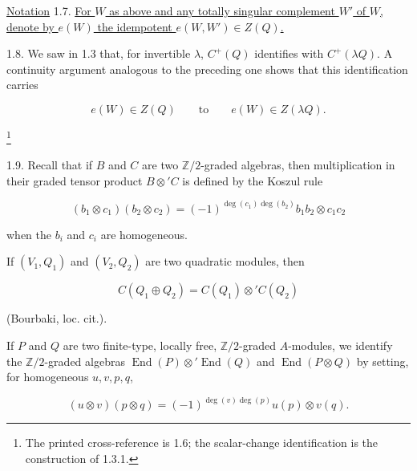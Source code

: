 \underline{Notation} 1.7. \underline{For $W$ as above and any totally
singular complement $W'$ of $W$, denote by $e(W)$ the idempotent
$e(W,W')\in Z(Q)$.}

1.8. We saw in 1.3 that, for invertible $\lambda$, $C^+(Q)$ identifies
with $C^+(\lambda Q)$.  A continuity argument analogous to the preceding
one shows that this identification carries

\begin{equation*}
e(W)\in Z(Q)\qquad\text{to}\qquad e(W)\in Z(\lambda Q).
\end{equation*}

\footnote{The printed cross-reference is 1.6; the scalar-change
identification is the construction of 1.3.1.}


1.9. Recall that if $B$ and $C$ are two $\mathbb Z/2$-graded algebras,
then multiplication in their graded tensor product $B\otimes' C$ is
defined by the Koszul rule

\begin{equation*}
(b_1\otimes c_1)(b_2\otimes c_2)
=(-1)^{\deg(c_1)\deg(b_2)}b_1b_2\otimes c_1c_2
\end{equation*}

when the $b_i$ and $c_i$ are homogeneous.

If $(V_1,Q_1)$ and $(V_2,Q_2)$ are two quadratic modules, then

\begin{equation*}
C(Q_1\oplus Q_2)=C(Q_1)\otimes' C(Q_2)
\end{equation*}

(Bourbaki, loc. cit.).

If $P$ and $Q$ are two finite-type, locally free, $\mathbb Z/2$-graded
$A$-modules, we identify the $\mathbb Z/2$-graded algebras
$\operatorname{End}(P)\otimes'\operatorname{End}(Q)$ and
$\operatorname{End}(P\otimes Q)$ by setting, for homogeneous
$u,v,p,q$,

\begin{equation*}
(u\otimes v)(p\otimes q)
=(-1)^{\deg(v)\deg(p)}u(p)\otimes v(q).
\end{equation*}
